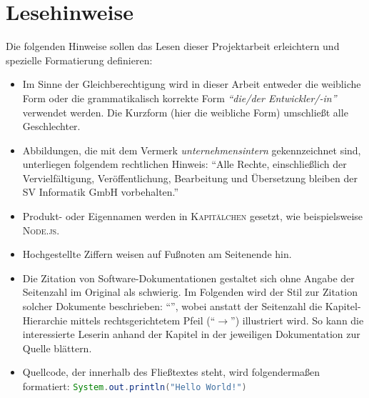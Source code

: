 \chapter*{Lesehinweise}
Die folgenden Hinweise sollen das Lesen dieser Projektarbeit erleichtern und spezielle Formatierung definieren:

\begin{itemize}
	\item Im Sinne der Gleichberechtigung wird in dieser Arbeit entweder die weibliche Form oder die grammatikalisch korrekte Form \textit{\enquote{die/der Entwickler/-in}} verwendet werden. Die Kurzform (hier die weibliche Form) umschließt alle Geschlechter.
	\item Abbildungen, die mit dem Vermerk \textit{unternehmensintern} gekennzeichnet sind, unterliegen folgendem rechtlichen Hinweis: \enquote{Alle Rechte, einschließlich der Vervielfältigung, Veröffentlichung, Bearbeitung und Übersetzung bleiben der SV Informatik GmbH vorbehalten.}
	\item Produkt- oder Eigennamen werden in \textsc{Kapitälchen} gesetzt, wie beispielsweise \textsc{Node.js}.
	\item Hochgestellte Ziffern weisen auf Fußnoten am Seitenende hin.
	\item Die Zitation von Software-Dokumentationen gestaltet sich ohne Angabe der Seitenzahl im Original als schwierig. Im Folgenden wird der Stil zur Zitation solcher Dokumente beschrieben: \enquote{\cite[vgl.][Application\,$\rightarrow$\,Deployments]{red_hat_inc_okd_2019}}, wobei anstatt der Seitenzahl die Kapitel-Hierarchie mittels rechtsgerichtetem Pfeil (\enquote{$\rightarrow$}) illustriert wird. So kann die interessierte Leserin anhand der Kapitel in der jeweiligen Dokumentation zur Quelle blättern.
	\item Quellcode, der innerhalb des Fließtextes steht, wird folgendermaßen formatiert: \lstinline[language=Java]|System.out.println("Hello World!")|
	
	
\end{itemize}
 
